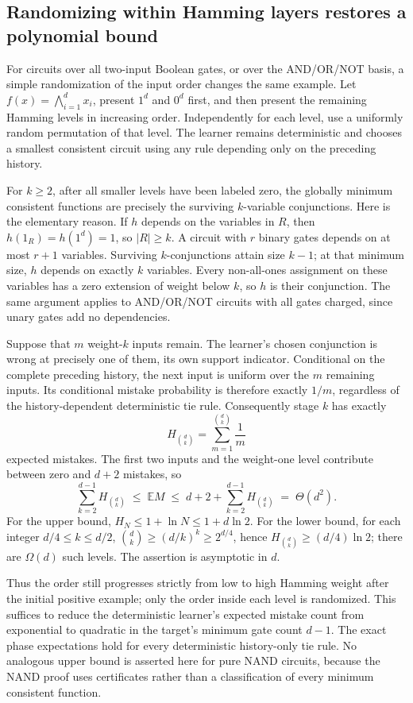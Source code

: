 \subsection{Randomizing within Hamming layers restores a polynomial bound}

For circuits over all two-input Boolean gates, or over the
AND/OR/NOT basis, a simple randomization of the input order changes
the same example. Let $f(x)=\bigwedge_{i=1}^d x_i$, present $1^d$
and $0^d$ first, and then present the remaining Hamming levels in
increasing order. Independently for each level, use a uniformly
random permutation of that level. The learner remains deterministic
and chooses a smallest consistent circuit using any rule depending
only on the preceding history.

For $k\ge2$, after all smaller levels have been labeled zero, the
globally minimum consistent functions are precisely the surviving
$k$-variable conjunctions. Here is the elementary reason. If $h$
depends on the variables in $R$, then $h(1_R)=h(1^d)=1$, so
$|R|\ge k$. A circuit with $r$ binary gates depends on at most
$r+1$ variables. Surviving $k$-conjunctions attain size $k-1$;
at that minimum size, $h$ depends on exactly $k$ variables.
Every non-all-ones assignment on these variables has a zero
extension of weight below $k$, so $h$ is their conjunction.
The same argument applies to AND/OR/NOT circuits with all gates
charged, since unary gates add no dependencies.

Suppose that $m$ weight-$k$ inputs remain. The learner's chosen
conjunction is wrong at precisely one of them, its own support
indicator. Conditional on the complete preceding history, the next
input is uniform over the $m$ remaining inputs. Its conditional
mistake probability is therefore exactly $1/m$, regardless of the
history-dependent deterministic tie rule. Consequently stage $k$
has exactly
\[
 H_{\binom dk}=\sum_{m=1}^{\binom dk}\frac1m
\]
expected mistakes. The first two inputs and the weight-one level
contribute between zero and $d+2$ mistakes, so
\[
 \sum_{k=2}^{d-1} H_{\binom dk}
 \;\le\; \mathbb E M
 \;\le\; d+2+\sum_{k=2}^{d-1} H_{\binom dk}
 \;=\;\Theta(d^2).
\]
For the upper bound, $H_N\le1+\ln N\le1+d\ln2$.
For the lower bound, for each integer
$d/4\le k\le d/2$,
$\binom dk\ge(d/k)^k\ge2^{d/4}$, hence
$H_{\binom dk}\ge(d/4)\ln2$; there are $\Omega(d)$
such levels. The assertion is asymptotic in $d$.

Thus the order still progresses strictly from low to high Hamming
weight after the initial positive example; only the order inside
each level is randomized. This suffices to reduce the deterministic
learner's expected mistake count from exponential to quadratic in
the target's minimum gate count $d-1$. The exact phase expectations
hold for every deterministic history-only tie rule. No analogous
upper bound is asserted here for pure NAND circuits, because the
NAND proof uses certificates rather than a classification of every
minimum consistent function.

